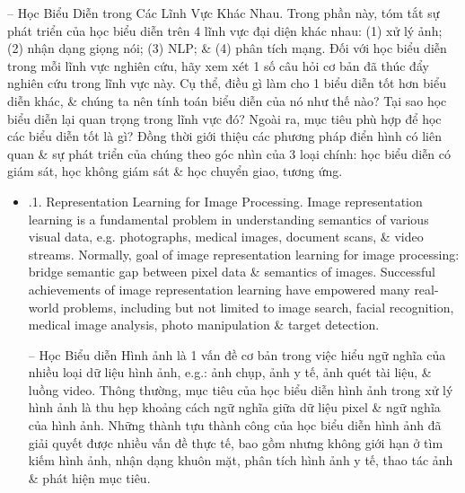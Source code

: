 \documentclass{article}
\begin{document}
\begin{itemize}
\begin{itemize}
        -- {\sf Học Biểu Diễn trong Các Lĩnh Vực Khác Nhau.} Trong phần này, tóm tắt sự phát triển của học biểu diễn trên 4 lĩnh vực đại diện khác nhau: (1) xử lý ảnh; (2) nhận dạng giọng nói; (3) NLP; \& (4) phân tích mạng. Đối với học biểu diễn trong mỗi lĩnh vực nghiên cứu, hãy xem xét 1 số câu hỏi cơ bản đã thúc đẩy nghiên cứu trong lĩnh vực này. Cụ thể, điều gì làm cho 1 biểu diễn tốt hơn biểu diễn khác, \& chúng ta nên tính toán biểu diễn của nó như thế nào? Tại sao học biểu diễn lại quan trọng trong lĩnh vực đó? Ngoài ra, mục tiêu phù hợp để học các biểu diễn tốt là gì? Đồng thời giới thiệu các phương pháp điển hình có liên quan \& sự phát triển của chúng theo góc nhìn của 3 loại chính: học biểu diễn có giám sát, học không giám sát \& học chuyển giao, tương ứng.
        \begin{itemize}
            \item {.1. Representation Learning for Image Processing.} Image representation learning is a fundamental problem in understanding semantics of various visual data, e.g. photographs, medical images, document scans, \& video streams. Normally, goal of image representation learning for image processing: bridge semantic gap between pixel data \& semantics of images. Successful achievements of image representation learning have empowered many real-world problems, including but not limited to image search, facial recognition, medical image analysis, photo manipulation \& target detection.

            -- Học Biểu diễn Hình ảnh là 1 vấn đề cơ bản trong việc hiểu ngữ nghĩa của nhiều loại dữ liệu hình ảnh, e.g.: ảnh chụp, ảnh y tế, ảnh quét tài liệu, \& luồng video. Thông thường, mục tiêu của học biểu diễn hình ảnh trong xử lý hình ảnh là thu hẹp khoảng cách ngữ nghĩa giữa dữ liệu pixel \& ngữ nghĩa của hình ảnh. Những thành tựu thành công của học biểu diễn hình ảnh đã giải quyết được nhiều vấn đề thực tế, bao gồm nhưng không giới hạn ở tìm kiếm hình ảnh, nhận dạng khuôn mặt, phân tích hình ảnh y tế, thao tác ảnh \& phát hiện mục tiêu.


\end{itemize}
\end{itemize}
\end{itemize}
\end{document}
